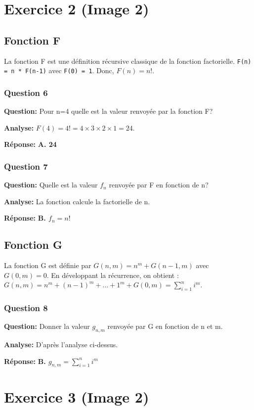 \documentclass[12pt,a4paper]{article}
\begin{document}
\section{Exercice 2 (Image 2)}

\subsection{Fonction F}
La fonction F est une définition récursive classique de la fonction factorielle.
\texttt{F(n) = n * F(n-1)} avec \texttt{F(0) = 1}. Donc, $F(n) = n!$.

\subsubsection{Question 6}
\textbf{Question:} Pour n=4 quelle est la valeur renvoyée par la fonction F?

\textbf{Analyse:} $F(4) = 4! = 4 \times 3 \times 2 \times 1 = 24$.

\textbf{Réponse:} \textbf{A. 24}

\subsubsection{Question 7}
\textbf{Question:} Quelle est la valeur $f_n$ renvoyée par F en fonction de n?

\textbf{Analyse:} La fonction calcule la factorielle de n.

\textbf{Réponse:} \textbf{B. $f_n = n!$}

\subsection{Fonction G}
La fonction G est définie par $G(n,m) = n^m + G(n-1,m)$ avec $G(0,m)=0$.
En développant la récurrence, on obtient :
$G(n,m) = n^m + (n-1)^m + \dots + 1^m + G(0,m) = \sum_{i=1}^{n} i^m$.

\subsubsection{Question 8}
\textbf{Question:} Donner la valeur $g_{n,m}$ renvoyée par G en fonction de n et m.

\textbf{Analyse:} D'après l'analyse ci-dessus.

\textbf{Réponse:} \textbf{B. $g_{n,m} = \sum_{i=1}^{n} i^m$}

\section{Exercice 3 (Image 2)}
\end{document}
